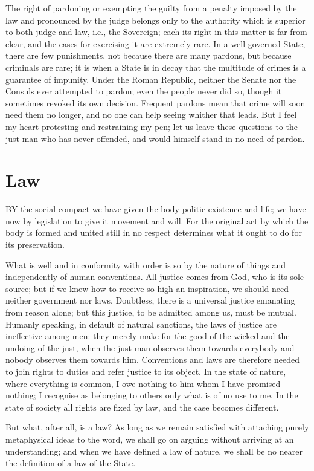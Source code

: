 \documentclass[12pt]{book}
\begin{document}
The right of pardoning or exempting the guilty from a penalty imposed by the law and pronounced by the judge belongs only to the authority which is superior to both judge and law, i.e., the Sovereign; each its right in this matter is far from clear, and the cases for exercising it are extremely rare. In a well-governed State, there are few punishments, not because there are many pardons, but because criminals are rare; it is when a State is in decay that the multitude of crimes is a guarantee of impunity. Under the Roman Republic, neither the Senate nor the Consuls ever attempted to pardon; even the people never did so, though it sometimes revoked its own decision. Frequent pardons mean that crime will soon need them no longer, and no one can help seeing whither that leads. But I feel my heart protesting and restraining my pen; let us leave these questions to the just man who has never offended, and would himself stand in no need of pardon.

\section{Law}
BY the social compact we have given the body politic existence and life; we have now by legislation to give it movement and will. For the original act by which the body is formed and united still in no respect determines what it ought to do for its preservation.

What is well and in conformity with order is so by the nature of things and independently of human conventions. All justice comes from God, who is its sole source; but if we knew how to receive so high an inspiration, we should need neither government nor laws. Doubtless, there is a universal justice emanating from reason alone; but this justice, to be admitted among us, must be mutual. Humanly speaking, in default of natural sanctions, the laws of justice are ineffective among men: they merely make for the good of the wicked and the undoing of the just, when the just man observes them towards everybody and nobody observes them towards him. Conventions and laws are therefore needed to join rights to duties and refer justice to its object. In the state of nature, where everything is common, I owe nothing to him whom I have promised nothing; I recognise as belonging to others only what is of no use to me. In the state of society all rights are fixed by law, and the case becomes different.

But what, after all, is a law? As long as we remain satisfied with attaching purely metaphysical ideas to the word, we shall go on arguing without arriving at an understanding; and when we have defined a law of nature, we shall be no nearer the definition of a law of the State.
\end{document}
